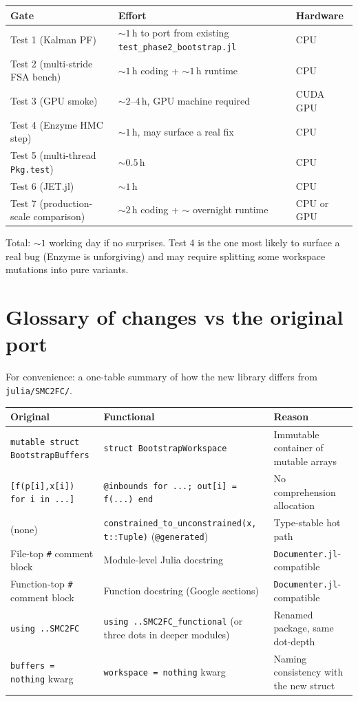 \documentclass[11pt,a4paper]{article}
\begin{document}
\begin{longtable}{p{}p{}p{}}
\toprule
\textbf{Gate} & \textbf{Effort} & \textbf{Hardware} \\
\midrule
Test 1 (Kalman PF) &
$\sim 1$\,h to port from existing \texttt{test\_phase2\_bootstrap.jl}
& CPU \\
Test 2 (multi-stride FSA bench) &
$\sim 1$\,h coding + $\sim 1$\,h runtime & CPU \\
Test 3 (GPU smoke) &
$\sim 2$--$4$\,h, GPU machine required & CUDA GPU \\
Test 4 (Enzyme HMC step) &
$\sim 1$\,h, may surface a real fix & CPU \\
Test 5 (multi-thread \texttt{Pkg.test}) &
$\sim 0.5$\,h & CPU \\
Test 6 (JET.jl) &
$\sim 1$\,h & CPU \\
Test 7 (production-scale comparison) &
$\sim 2$\,h coding + $\sim$ overnight runtime & CPU or GPU \\
\bottomrule
\end{longtable}

Total: $\sim 1$ working day if no surprises. Test 4 is the one most
likely to surface a real bug (Enzyme is unforgiving) and may require
splitting some workspace mutations into pure variants.

\section{Glossary of changes vs the original port}

For convenience: a one-table summary of how the new library differs from
\texttt{julia/SMC2FC/}.

\begin{longtable}{p{}p{}p{}}
\toprule
\textbf{Original} & \textbf{Functional} & \textbf{Reason} \\
\midrule
\texttt{mutable struct BootstrapBuffers} &
\texttt{struct BootstrapWorkspace} &
Immutable container of mutable arrays \\
\texttt{[f(p[i],x[i]) for i in ...]} &
\texttt{@inbounds for ...; out[i] = f(...) end} &
No comprehension allocation \\
(none) &
\texttt{constrained\_to\_unconstrained(x, t::Tuple)}
(\texttt{@generated}) &
Type-stable hot path \\
File-top \texttt{\#} comment block &
Module-level Julia docstring &
\texttt{Documenter.jl}-compatible \\
Function-top \texttt{\#} comment block &
Function docstring (Google sections) &
\texttt{Documenter.jl}-compatible \\
\texttt{using ..SMC2FC} &
\texttt{using ..SMC2FC\_functional} (or three dots in deeper modules)
&
Renamed package, same dot-depth \\
\texttt{buffers = nothing} kwarg &
\texttt{workspace = nothing} kwarg &
Naming consistency with the new struct \\
\bottomrule
\end{longtable}
\end{document}
